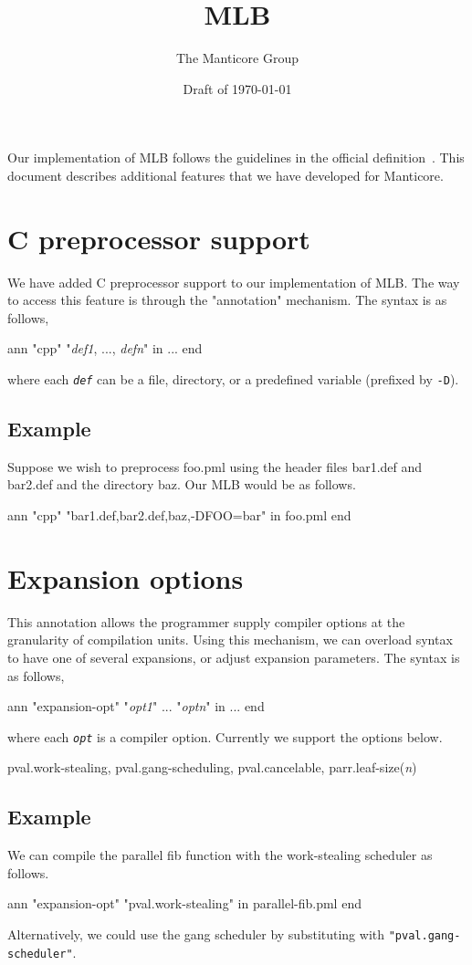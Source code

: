 \documentclass[11pt]{article}
\title{MLB}
\author{The Manticore Group}
\date{Draft of \today}
\begin{document}
\maketitle

Our implementation of MLB follows the guidelines in the official definition~\cite{mlton-mlb}. This document describes additional features that we have developed for Manticore.

\section{C preprocessor support}
We have added C preprocessor support to our implementation of MLB. The way to access this feature is through the "annotation" mechanism. The syntax is as follows,
\begin{centercode}
  ann "cpp" "\emph{def1}, ..., \emph{defn}"
  in
    ...
  end
\end{centercode}

where each \texttt{\emph{def}} can be a file, directory, or a predefined variable (prefixed by \texttt{-D}).

\subsection{Example}
Suppose we wish to preprocess foo.pml using the header files bar1.def and bar2.def and the directory baz. Our MLB would be as follows.
\begin{centercode}
  ann "cpp" "bar1.def,bar2.def,baz,-DFOO=bar"
  in
    foo.pml
  end
\end{centercode}

\section{Expansion options}
This annotation allows the programmer supply compiler options at the granularity of compilation units. Using this mechanism, we can overload syntax to have one of several expansions, or adjust expansion parameters. The syntax is as follows,
\begin{centercode}
  ann "expansion-opt" "\emph{opt1}" ... "\emph{optn}"
  in
    ...
  end
\end{centercode}
where each \texttt{\emph{opt}} is a compiler option. Currently we support the options below.
\begin{centercode}
  pval.work-stealing, pval.gang-scheduling, pval.cancelable, parr.leaf-size(\emph{n})
\end{centercode}

\subsection{Example}
We can compile the parallel fib function with the work-stealing scheduler as follows.
\begin{centercode}
  ann "expansion-opt" "pval.work-stealing"
  in
    parallel-fib.pml
  end
\end{centercode}
Alternatively, we could use the gang scheduler by substituting with \texttt{"pval.gang-scheduler"}.



\end{document}
